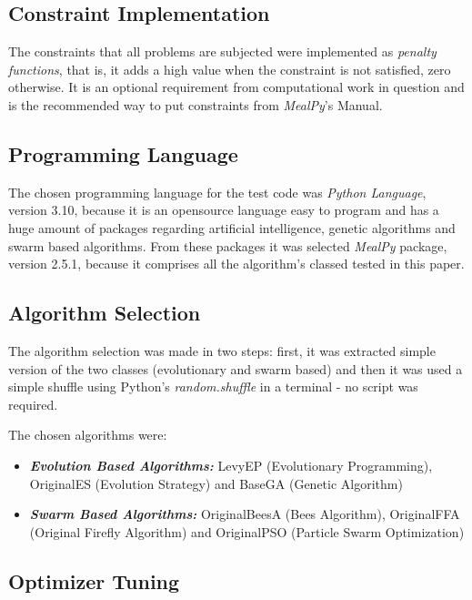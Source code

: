 \documentclass[conference]{IEEEtran}
\begin{document}
\subsection{Constraint Implementation}
\label{subsec:methodology-constraint-implementation}
The constraints that all problems are subjected were implemented as \textit{penalty functions},
that is, it adds a high value when the constraint is not satisfied, zero otherwise. It is an optional requirement
from computational work in question and is the recommended way to put constraints from \textit{MealPy}'s
Manual.

\subsection{Programming Language}
\label{subsec:methodology-programming-language}

The chosen programming language for the test code was \textit{Python Language}, version 3.10, because it is an opensource language easy to
program and has a huge amount of packages regarding artificial intelligence, genetic algorithms and swarm based algorithms.
From these packages it was selected \textit{MealPy} package, version 2.5.1, because it comprises all the algorithm's classed tested in this paper.

\subsection{Algorithm Selection}
\label{subsec:methodology-algorithm-selection}

The algorithm selection was made in two steps: first, it was extracted simple version of the two classes (evolutionary and swarm based) and
then it was used a simple shuffle using Python's \textit{random.shuffle} in a terminal - no script was required.

The chosen algorithms were:

\begin{itemize}
    \item \textit{\textbf{Evolution Based Algorithms: }} LevyEP (Evolutionary Programming),
    OriginalES (Evolution Strategy) and BaseGA (Genetic Algorithm)
    \item \textit{\textbf{Swarm Based Algorithms: }} OriginalBeesA (Bees Algorithm),
    OriginalFFA (Original Firefly Algorithm) and OriginalPSO (Particle Swarm Optimization)
\end{itemize}

\subsection{Optimizer Tuning}
\label{subsec:methodology-optimizer-tuning}
\end{document}
